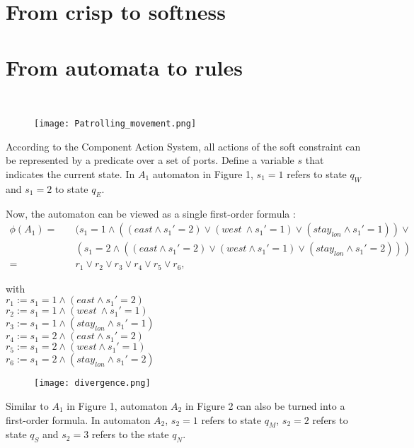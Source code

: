 \section{From crisp to softness}


\newpage 

\section{From automata to rules} \hspace{0pt} \\

\begin{figure}[!h]
	\centering
	\texttt{[image: Patrolling\_movement.png]}
\end{figure}
\noindent
According to the Component Action System, all actions of the soft constraint can be represented by a predicate over a set of ports.
Define a variable $s$ that indicates the current state. In $A_1$ automaton in Figure 1, $s_1=1$ refers to state $q_W$ and $s_1=2$ to state $q_E$.

Now, the automaton can be viewed as a single first-order formula :
\begin{align*}
\phi(A_1) =  & \quad ( s_1=1 \land ((east\land s_1'=2) \lor (west\ \land s_1'=1) \lor (stay_{lon}\land s_1'=1)) \lor  \\
&\quad(s_1=2 \land ((east \land s_1'=2) \lor (west \land s_1'= 1 )\lor (stay_{lon} \land s_1'=2))) \\
=  & \quad r_1 \lor r_2 \lor r_3 \lor r_4 \lor r_5 \lor r_6,
\end{align*}

\noindent
with\\ 
$r_1 := s_1=1 \land (east\land s_1'=2)$ \\ \quad
$r_2 := s_1=1 \land (west\ \land s_1'=1)$ \\ \quad
$r_3 := s_1=1 \land (stay_{lon}\land s_1'=1)$\\ \quad
$r_4 := s_1=2 \land (east \land s_1'=2)$ \\ \quad
$r_5 := s_1=2 \land (west \land s_1'= 1 )$\\ \quad
$r_6 := s_1=2 \land (stay_{lon} \land s_1'=2)$\\ \quad
\begin{figure}[!h]
	\centering
	\texttt{[image: divergence.png]}
\end{figure}

\noindent
Similar to $A_1$ in Figure 1, automaton $A_2$ in Figure 2 can also be turned into a first-order formula. In automaton $A_2$, $s_2=1$ refers to state $q_M$, $s_2=2$ refers to state $q_S$ and $s_2=3$ refers to the state $q_N$.

